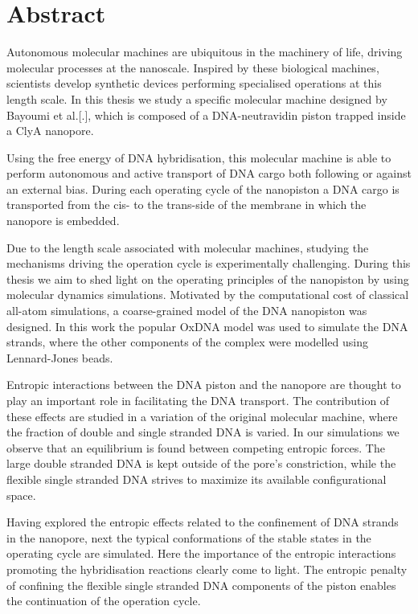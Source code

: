 \chapter*{Abstract}

Autonomous molecular machines are ubiquitous in the machinery of life, driving molecular
processes at the nanoscale. Inspired by these biological machines, scientists develop
synthetic devices performing specialised operations at this length scale. In this
thesis we study a specific molecular machine designed by Bayoumi et al.[.], which is
composed of a DNA-neutravidin piston trapped inside a ClyA nanopore.

Using the free energy of DNA hybridisation, this molecular machine is able to perform
autonomous and active transport of DNA cargo both following or against an
external bias. During each operating cycle of the nanopiston a DNA cargo
is transported from the cis- to the trans-side of the membrane in which the nanopore is
embedded.

Due to the length scale associated with molecular machines, studying the mechanisms
driving the operation cycle is experimentally challenging. During this thesis we aim
to shed light on the operating principles of the nanopiston by using molecular dynamics
simulations. Motivated by the computational cost of classical all-atom simulations, a
coarse-grained model of the DNA nanopiston was designed. In this work the popular OxDNA
model was used to simulate the DNA strands, where the other components of the complex
were modelled using Lennard-Jones beads.

Entropic interactions between the DNA piston and the nanopore are thought to
play an important role in facilitating the DNA transport. The contribution of
these effects are studied in a variation of the original molecular machine, where the
fraction of double and single stranded DNA is varied. In our simulations we
observe that an equilibrium is found between competing entropic forces. The large double
stranded DNA is kept outside of the pore's constriction, while the flexible single
stranded DNA strives to maximize its available configurational space.

Having explored the entropic effects related to the confinement of DNA strands in the
nanopore, next the typical conformations of the stable states in the operating cycle
are simulated. Here the importance of the entropic interactions promoting the
hybridisation reactions clearly come to light. The entropic penalty of confining the
flexible single stranded DNA components of the piston enables the continuation of the
operation cycle.

